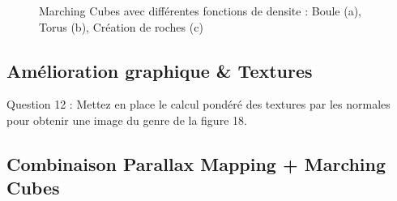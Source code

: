 \documentclass[a4paper]{article}
\begin{document}
\begin{figure}[H]
\centering
{}
\caption{Marching Cubes avec différentes fonctions de densite : Boule (a), Torus (b), Création de roches (c)}
\end{figure}

\subsection{Amélioration graphique \& Textures}


Question 12 : Mettez en place le calcul pondéré des textures par les normales pour obtenir une image du genre de la
figure 18.



\subsection{Combinaison Parallax Mapping + Marching Cubes}




\end{document}
